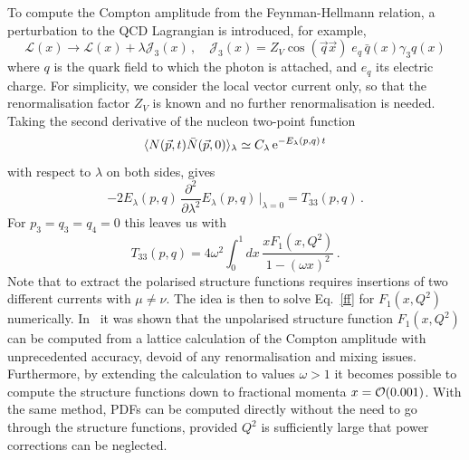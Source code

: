 To compute the Compton amplitude from the Feynman-Hellmann relation, a perturbation to the QCD Lagrangian is introduced, for example,
\begin{equation}
\mathcal{L}(x) \rightarrow \mathcal{L}(x) + \lambda \mathcal{J}_3(x)\,, \quad \mathcal{J}_3(x)=Z_V\cos(\vec{q}\vec{x})\; e_q \,\bar{q}(x)\gamma_3 q(x) 
\label{in}
\end{equation}
where $q$ is the quark field to which the photon is attached, and $e_q$ its electric charge. For simplicity, we consider the local vector current only, so that the renormalisation factor $Z_V$ is known and no further renormalisation is needed. Taking the second derivative of the nucleon two-point function 
\begin{equation}
\langle N(\vec{p},t) \bar{N}(\vec{p},0)\rangle_\lambda \simeq C_\lambda\, {\rm e}^{-E_\lambda(p,q)\,t}
\end{equation}
with respect to $\lambda$ on both sides, gives
\begin{equation}
-2 E_\lambda(p,q)\, \frac{\partial^2}{\partial\lambda^2}  E_\lambda(p,q)\,\big|_{\lambda=0} = T_{33}(p,q) \,.
\end{equation}
For $p_3=q_3=q_4=0$ this leaves us with
\begin{equation}
T_{33}(p,q) = 4 \omega^2 \int_0^1 dx\,  \frac{xF_1(x,Q^2)}{1-(\omega x)^2} \,.
\label{ff}
\end{equation}
Note that to extract the polarised structure functions requires insertions of two different currents with $\mu\neq \nu$. The idea is then to solve Eq.~\eqref{ff} for $F_1(x,Q^2)$ numerically.
%
In~\cite{Chambers:2017dov} it was shown that the unpolarised structure function $F_1(x,Q^2)$ can be computed from a lattice calculation of the Compton amplitude with unprecedented accuracy, devoid of any renormalisation and mixing issues. Furthermore, by extending the calculation to values $\omega > 1$ it becomes possible
to compute the structure functions down to fractional momenta $x = {\cal O}(0.001)$. With the same method, PDFs can be computed directly without the need to go through the structure functions, provided $Q^2$ is sufficiently large that power corrections can be neglected. 

